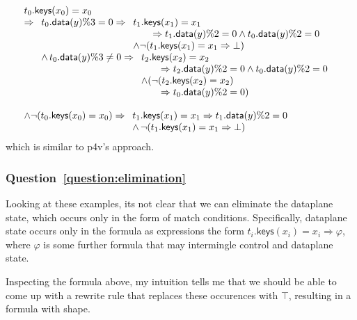 \documentclass{article}
\newcommand{\MatchRow}{\mathsf{keys}}
\newcommand{\ActionDataRow}{\mathsf{data}}
\begin{document}
\[
\begin{array}{l}
  t_0.\MatchRow(x_0) = x_0 \\
  \Rightarrow
  \begin{array}[t]{l}
    t_0.\ActionDataRow(y) \% 3 = 0 \Rightarrow
    \begin{array}[t]{l}
      t_1.\MatchRow(x_1) = x_1 \\
      \qquad \Rightarrow t_1.\ActionDataRow(y) \% 2 = 0 \wedge t_0.\ActionDataRow(y)\% 2 = 0 \\
      \wedge \neg (t_1.\MatchRow(x_1) = x_1 \Rightarrow \bot) \\
    \end{array} \\
    \wedge\,t_0.\ActionDataRow(y) \% 3 \neq 0 \Rightarrow
    \begin{array}[t]{l}
      t_2.\MatchRow(x_2) = x_2 \\
      \qquad \Rightarrow t_2.\ActionDataRow(y) \% 2 = 0 \wedge t_0.\ActionDataRow(y)\% 2 = 0 \\
      \wedge (\neg (t_2.\MatchRow(x_2) = x_2) \\
      \qquad \Rightarrow t_0.\ActionDataRow(y) \% 2 = 0)
    \end{array}
  \end{array} \\\\
  \wedge \neg (t_0.\MatchRow(x_0) = x_0)
  \Rightarrow
  \begin{array}[t]{l}
    t_1.\MatchRow(x_1) = x_1 \Rightarrow t_1.\ActionDataRow(y) \% 2 = 0 \\
    \wedge \, \neg(t_1.\MatchRow(x_1) = x_1 \Rightarrow \bot)\\
    \end{array}
\end{array}
\]
which is similar to p4v's approach.

\subsubsection{Question~\ref{question:elimination}}

Looking at these examples, its not clear that we can eliminate the dataplane
state, which occurs only in the form of match conditions. Specifically,
dataplane state occurs only in the formula as expressions the form
\(t_i.\MatchRow(x_i) = x_i \Rightarrow \varphi\), where \(\varphi\) is some
further formula that may intermingle control and dataplane state.

Inspecting the formula above, my intuition tells me that we should be able to
come up with a rewrite rule that replaces these occurences with \(\top\),
resulting in a formula with shape.
\end{document}
